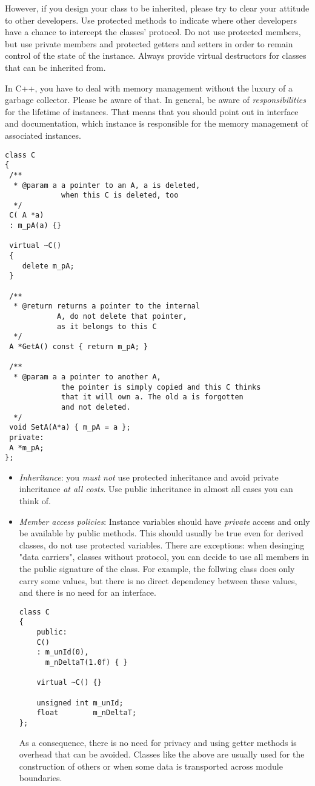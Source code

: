 However, if you design your class to be inherited, please try to clear your attitude to other developers.
Use protected methods to indicate where other developers have a chance to intercept the classes' protocol.
Do not use protected members, but use private members and protected getters and setters in order to remain control of the state of the instance.
Always provide virtual destructors for classes that can be inherited from.

In C++, you have to deal with memory management without the luxury of a garbage collector.
Please be aware of that.
In general, be aware of \emph{responsibilities} for the lifetime of instances.
That means that you should point out in interface and documentation, which instance is responsible for the memory management of associated instances.
\begin{verbatim}
class C
{
 /**
  * @param a a pointer to an A, a is deleted, 
             when this C is deleted, too
  */
 C( A *a)
 : m_pA(a) {}
 
 virtual ~C()
 {
 	delete m_pA;
 }
 
 /**
  * @return returns a pointer to the internal
            A, do not delete that pointer,
            as it belongs to this C
  */
 A *GetA() const { return m_pA; }
 
 /**
  * @param a a pointer to another A,
             the pointer is simply copied and this C thinks
             that it will own a. The old a is forgotten
             and not deleted.
  */
 void SetA(A*a) { m_pA = a };
 private:
 A *m_pA;
};
\end{verbatim}

\begin{itemize}
\item \emph{Inheritance}: you \emph{must not} use protected inheritance and avoid private inheritance \emph{at all costs}.
Use public inheritance in almost all cases you can think of.
\item \emph{Member access policies}: Instance variables should have \emph{private} access and only be available by public methods.
This should usually be true even for derived classes, do not use protected variables.
There are exceptions: when desinging "data carriers", classes without protocol, you can decide to use all members in the public signature of the class.
For example, the follwing class does only carry some values, but there is no direct dependency between these values, and there is no need for an interface.
\begin{verbatim}
class C
{
	public:
	C()
	: m_unId(0),
	  m_nDeltaT(1.0f) { }
	  
	virtual ~C() {}
	
	unsigned int m_unId;
	float        m_nDeltaT;
};
\end{verbatim}
As a consequence, there is no need for privacy and using getter methods is overhead that can be avoided.
Classes like the above are usually used for the construction of others or when some data is transported across module boundaries.
\end{itemize}

